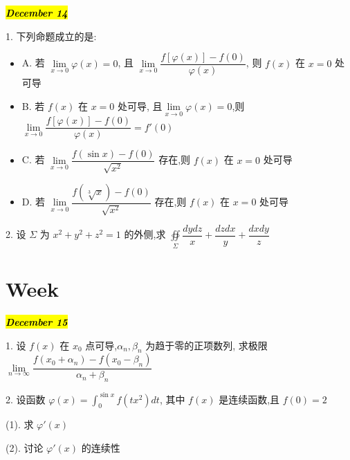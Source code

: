\hl{\textbf{\textit{December 14}}}

1. 下列命题成立的是:
\begin{itemize}
	\item A. 若 $\lim\limits_{x\rightarrow 0}\varphi(x)=0$, 且 $\lim\limits_{x\rightarrow 0}\dfrac{f\left[\varphi(x)\right]-f(0)}{\varphi(x)}$, 则 $f(x)$ 在 $x=0$ 处可导
	\item B. 若 $f(x)$ 在 $x=0$ 处可导, 且$\lim\limits_{x\rightarrow 0}\varphi(x)=0$,则$\lim\limits_{x\rightarrow 0}\dfrac{f\left[\varphi(x)\right]-f(0)}{\varphi(x)}=f'(0)$
	\item C. 若 $\lim\limits_{x\rightarrow 0}\dfrac{f(\sin x)-f(0)}{\sqrt{x^{2}}}$ 存在,则 $f(x)$ 在 $x=0$ 处可导
	\item D. 若 $\lim\limits_{x\rightarrow 0}\dfrac{f(\sqrt[3]{x})-f(0)}{\sqrt{x^{2}}}$ 存在,则 $f(x)$ 在 $x=0$ 处可导
\end{itemize}
\begin{solution}
	
\end{solution}

2. 设 $\Sigma$ 为 $x^{2}+y^{2}+z^{2}=1$ 的外侧,求 $\displaystyle{\oiint\limits_{\Sigma}\dfrac{dydz}{x}+\dfrac{dzdx}{y}+\dfrac{dxdy}{z}}$
\begin{solution}
	
\end{solution}

\section{Week }
\hl{\textbf{\textit{December 15}}}

1. 设 $f(x)$ 在 $x_{0}$ 点可导,$\alpha_{n},\beta_{n}$ 为趋于零的正项数列, 求极限 $\lim\limits_{n\rightarrow\infty}\dfrac{f(x_{0}+\alpha_{n})-f(x_{0}-\beta_{n})}{\alpha_{n}+\beta_{n}}$
\begin{solution}
	
\end{solution}

2. 设函数 $\displaystyle{\varphi(x)=\int_{0}^{\sin x}f(tx^{2})dt}$, 其中 $f(x)$ 是连续函数,且 $f(0)=2$

(1). 求 $\varphi'(x)$

(2). 讨论 $\varphi'(x)$ 的连续性
\begin{solution}
	
\end{solution}

